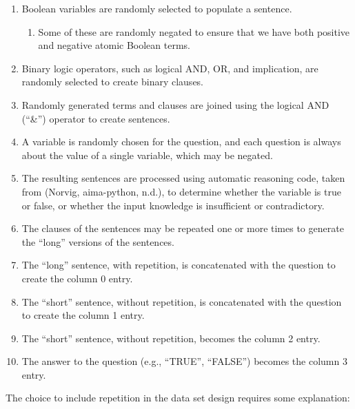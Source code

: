 \documentclass[
]{article}
\begin{document}
\begin{enumerate}
\def\labelenumi{\arabic{enumi}.}
\item
  Boolean variables are randomly selected to populate a sentence.

  \begin{enumerate}
  \def\labelenumii{\alph{enumii}.}
  \item
    Some of these are randomly negated to ensure that we have both
    positive and negative atomic Boolean terms.
  \end{enumerate}
\item
  Binary logic operators, such as logical AND, OR, and implication, are
  randomly selected to create binary clauses.
\item
  Randomly generated terms and clauses are joined using the logical AND
  (``\&'') operator to create sentences.
\item
  A variable is randomly chosen for the question, and each question is
  always about the value of a single variable, which may be negated.
\item
  The resulting sentences are processed using automatic reasoning code,
  taken from (Norvig, aima-python, n.d.), to determine whether the
  variable is true or false, or whether the input knowledge is
  insufficient or contradictory.
\item
  The clauses of the sentences may be repeated one or more times to
  generate the ``long'' versions of the sentences.
\item
  The ``long'' sentence, with repetition, is concatenated with the
  question to create the column 0 entry.
\item
  The ``short'' sentence, without repetition, is concatenated with the
  question to create the column 1 entry.
\item
  The ``short'' sentence, without repetition, becomes the column 2
  entry.
\item
  The answer to the question (e.g., ``TRUE'', ``FALSE'') becomes the
  column 3 entry.
\end{enumerate}

The choice to include repetition in the data set design requires some
explanation:
\end{document}
